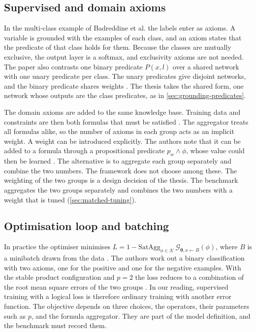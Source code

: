 \subsection{Supervised and domain axioms}
\label{sec:supervised-domain-axioms}

In the multi-class example of Badreddine et al. the labels enter as axioms. A
variable is grounded with the examples of each class, and an axiom states that
the predicate of that class holds for them. Because the classes are mutually
exclusive, the output layer is a softmax, and exclusivity axioms are not
needed. The paper also contrasts one binary predicate $P(x,l)$ over a shared
network with one unary predicate per class. The unary predicates give disjoint
networks, and the binary predicate shares weights
\citep{badreddine2022ltn}. The thesis takes the shared form, one network whose
outputs are the class predicates, as in \cref{sec:grounding-predicates}.

The domain axioms are added to the same knowledge base. Training data and
constraints are then both formulas that must be satisfied
\citep{badreddine2022ltn}. The aggregator treats all formulas alike, so the
number of axioms in each group acts as an implicit weight. A weight can be
introduced explicitly. The authors note that it can be added to a formula
through a propositional predicate $p_w\wedge\phi$, whose value could then be
learned \citep{badreddine2022ltn}. The alternative is to aggregate each group
separately and combine the two numbers. The framework does not choose among
these. The weighting of the two groups is a design decision of the thesis.
The benchmark aggregates the two groups separately and combines the two numbers
with a weight that is tuned (\cref{sec:matched-tuning}).

\subsection{Optimisation loop and batching}
\label{sec:optimisation-loop}

In practice the optimiser minimises
$L=1-\mathrm{SatAgg}_{\phi\in\mathcal{K}}\,\mathcal{G}_{\boldsymbol{\theta},
x\leftarrow B}(\phi)$, where $B$ is a minibatch drawn from the data
\citep{badreddine2022ltn}. The authors work out a binary classification with
two axioms, one for the positive and one for the negative examples. With the
stable product configuration and $p=2$ the loss reduces to a combination of
the root mean square errors of the two groups \citep{badreddine2022ltn}.
In our reading, supervised training with a logical loss is therefore ordinary
training with another error function. The objective depends on three choices, the operators,
their parameters such as $p$, and the formula aggregator. They are part of the
model definition, and the benchmark must record them.

